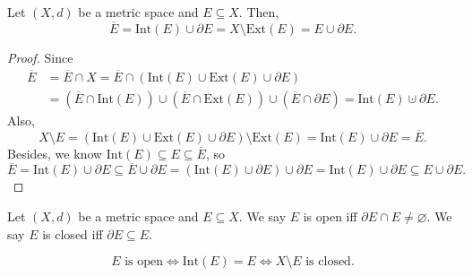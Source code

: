 \begin{corollary}
    Let \((X,d)\) be a metric space and \(E \subseteq X\). Then, 
    \[
        \overline{E} = \mathrm{Int}(E) \cup \partial E = X \setminus \mathrm{Ext}(E) = E \cup \partial E.    
    \] 
\end{corollary}
\begin{proof}
    Since
    \begin{align*}
        \overline{E} &= \overline{E} \cap X = \overline{E} \cap (\mathrm{Int}(E) \cup \mathrm{Ext}(E) \cup \partial E) \\
        &= \left( \overline{E} \cap \mathrm{Int}(E)   \right) \cup \left( \overline{E} \cap \mathrm{Ext}(E)   \right) \cup \left( \overline{E} \cap \partial E  \right) = \mathrm{Int}(E) \cupdot \partial E.   
    \end{align*}
    Also,
    \[
        X \setminus E = \left( \mathrm{Int}(E) \cup \mathrm{Ext}(E) \cup \partial E   \right) \setminus \mathrm{Ext}(E) = \mathrm{Int}(E) \cup \partial E = \overline{E}.   
    \]  
    Besides, we know \(\mathrm{Int}(E) \subseteq E \subseteq \overline{E}  \), so 
    \[
        \overline{E} = \mathrm{Int}(E) \cup \partial E \subseteq \overline{E} \cup \partial E = \left( \mathrm{Int}(E) \cup \partial E  \right) \cup \partial E = \mathrm{Int}(E) \cup \partial E \subseteq E \cup \partial E.      
    \] 
\end{proof}

\begin{definition}
    Let \((X, d)\) be a metric space and \(E \subseteq X\). We say \(E\) is open iff \(\partial E \cap E \neq \varnothing \). We say \(E\) is closed iff \(\partial E \subseteq E\).      
\end{definition}

\begin{proposition} \label{proposition: open set equivalent condition}
    \[
        E \text{ is open} \iff \mathrm{Int}(E) = E \iff X \setminus E \text{ is closed.} 
    \]
\end{proposition}


